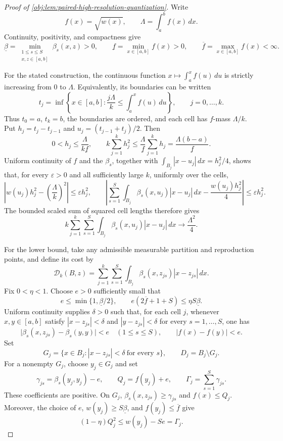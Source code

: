 \documentclass[11pt]{article}
\begin{document}
\begin{proof}[Proof of \cref{obj:lem:paired-high-resolution-quantization}]
Write
\[
f(x)=\sqrt{w(x)},\qquad \Lambda=\int_a^b f(x)\,dx.
\]
Continuity, positivity, and compactness give
\[
\underline\beta
=\min_{\substack{1\le s\le S\\x,z\in[a,b]}}\beta_s(x,z)>0,
\qquad
\underline f=\min_{x\in[a,b]}f(x)>0,
\qquad
\overline f=\max_{x\in[a,b]}f(x)<\infty.
\]

For the stated construction, the continuous function \(x\mapsto\int_a^x f(u)\,du\) is strictly increasing from \(0\) to \(\Lambda\). Equivalently, its boundaries can be written
\[
t_j=\inf\left\{x\in[a,b]:
\frac{j\Lambda}{k}\le\int_a^x f(u)\,du\right\},
\qquad j=0,\ldots,k.
\]
Thus \(t_0=a\), \(t_k=b\), the boundaries are ordered, and each cell has \(f\)-mass \(\Lambda/k\). Put \(h_j=t_j-t_{j-1}\) and \(u_j=(t_{j-1}+t_j)/2\). Then
\[
0<h_j\le\frac{\Lambda}{k\underline f},
\qquad
k\sum_{j=1}^k h_j^2
\le\frac{\Lambda}{\underline f}\sum_{j=1}^k h_j
=\frac{\Lambda(b-a)}{\underline f}.
\]
Uniform continuity of \(f\) and the \(\beta_s\), together with
\(\int_{B_j}|x-u_j|\,dx=h_j^2/4\), shows that, for every \(\varepsilon>0\) and all sufficiently large \(k\), uniformly over the cells,
\[
\left|w(u_j)h_j^2-\left(\frac{\Lambda}{k}\right)^2\right|
\le\varepsilon h_j^2,
\qquad
\left|
\sum_{s=1}^S\int_{B_j}\beta_s(x,u_j)|x-u_j|\,dx
-\frac{w(u_j)h_j^2}{4}
\right|
\le\varepsilon h_j^2.
\]
The bounded scaled sum of squared cell lengths therefore gives
\[
k\sum_{j=1}^k\sum_{s=1}^S
\int_{B_j}\beta_s(x,u_j)|x-u_j|\,dx
\longrightarrow\frac{\Lambda^2}{4}.
\]

For the lower bound, take any admissible measurable partition and reproduction points, and define its cost by
\[
\mathcal D_k(B,z)
=\sum_{j=1}^k\sum_{s=1}^S
\int_{B_j}\beta_s(x,z_{js})|x-z_{js}|\,dx.
\]
Fix \(0<\eta<1\). Choose \(e>0\) sufficiently small that
\[
e\le\min\{1,\underline\beta/2\},
\qquad
e(2\overline f+1+S)\le\eta S\underline\beta.
\]
Uniform continuity supplies \(\delta>0\) such that, for each cell \(j\), whenever \(x,y\in[a,b]\) satisfy \(|x-z_{js}|<\delta\) and \(|y-z_{js}|<\delta\) for every \(s=1,\ldots,S\), one has
\[
\bigl|\beta_s(x,z_{js})-\beta_s(y,y)\bigr|<e
\quad(1\le s\le S),
\qquad |f(x)-f(y)|<e.
\]
Set
\[
G_j=\{x\in B_j:|x-z_{js}|<\delta\ \text{for every }s\},
\qquad D_j=B_j\setminus G_j.
\]
For a nonempty \(G_j\), choose \(y_j\in G_j\) and set
\[
\gamma_{js}=\beta_s(y_j,y_j)-e,\qquad
Q_j=f(y_j)+e,\qquad
\Gamma_j=\sum_{s=1}^S\gamma_{js}.
\]
These coefficients are positive. On \(G_j\), \(\beta_s(x,z_{js})\ge\gamma_{js}\) and \(f(x)\le Q_j\). Moreover, the choice of \(e\), \(w(y_j)\ge S\underline\beta\), and \(f(y_j)\le\overline f\) give
\[
(1-\eta)Q_j^2
\le w(y_j)-Se
=\Gamma_j.
\]


\end{proof}
\end{document}
